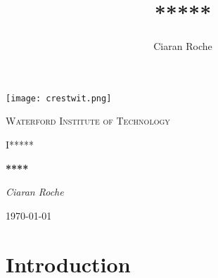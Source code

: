 \documentclass[11pt]{article}
\title{*****}
\author{Ciaran Roche}
\begin{document}
\begin{titlepage}
	\centering
	\texttt{[image: crestwit.png]}\par\vspace{1cm}
	{\scshape\LARGE Waterford Institute of Technology \par}
	\vspace{1cm}
	{\scshape\Large I***** \par}
	\vspace{1.5cm}
	{\huge\bfseries *****\par}
	\vspace{2cm}
	{\Large\itshape Ciaran Roche\par}
	\vfill
	{\large \today\par}
\end{titlepage}

\begin{abstract}

\end{abstract}

\section{Introduction}
\end{document}
